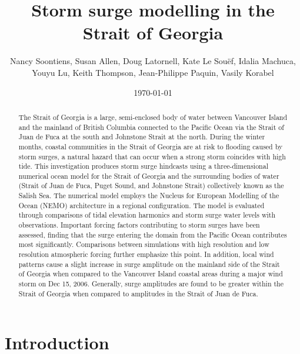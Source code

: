 \documentclass[pdftex,10pt]{article}
\title{Storm surge modelling in the Strait of Georgia}
\author{Nancy Soontiens, Susan Allen, Doug Latornell, Kate Le Sou\"{e}f, Idalia Machuca,
\\ Youyu Lu, Keith Thompson, Jean-Philippe Paquin, Vasily Korabel}
\date{\today}
\begin{document}
\maketitle

\begin{abstract}
The Strait of Georgia is a large, semi-enclosed body of water between Vancouver Island and the mainland of British Columbia connected to the Pacific Ocean via the Strait of Juan de Fuca at the south and Johnstone Strait at the north. During the winter months, coastal communities in the Strait of Georgia are at risk to flooding caused by storm surges, a natural hazard that can occur when a strong storm coincides with high tide. This investigation produces storm surge hindcasts using a three-dimensional numerical ocean model for the Strait of Georgia and the surrounding bodies of water (Strait of Juan de Fuca, Puget Sound, and Johnstone Strait) collectively known as the Salish Sea. The numerical model employs the Nucleus for European Modelling of the Ocean (NEMO) architecture in a regional configuration. The model is evaluated through comparisons of tidal elevation harmonics and storm surge water levels with observations. Important forcing factors contributing to storm surges have been assessed, finding that the surge entering the domain from the Pacific Ocean contributes most significantly. Comparisons between simulations with high resolution and low resolution atmospheric forcing further emphasize this point. In addition, local wind patterns cause a slight increase in surge amplitude on the mainland side of the Strait of Georgia when compared to the Vancouver Island coastal areas during a major wind storm on Dec 15, 2006. Generally, surge amplitudes are found to be greater within the Strait of Georgia when compared to amplitudes in the Strait of Juan de Fuca. 
\end{abstract}

\section{Introduction}\label{sec:intro}
\end{document}
